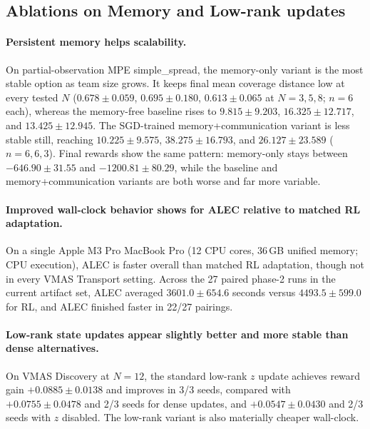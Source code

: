 \subsection{Ablations on Memory and Low-rank updates}

\paragraph{Persistent memory helps scalability.} On partial-observation MPE simple\_spread, the memory-only variant is the most stable option as team size grows. It keeps final mean coverage distance low at every tested $N$ ($0.678 \pm 0.059$, $0.695 \pm 0.180$, $0.613 \pm 0.065$ at $N=3,5,8$; $n=6$ each), whereas the memory-free baseline rises to $9.815 \pm 9.203$, $16.325 \pm 12.717$, and $13.425 \pm 12.945$. The SGD-trained memory+communication variant is less stable still, reaching $10.225 \pm 9.575$, $38.275 \pm 16.793$, and $26.127 \pm 23.589$ ($n=6,6,3$). Final rewards show the same pattern: memory-only stays between $-646.90 \pm 31.55$ and $-1200.81 \pm 80.29$, while the baseline and memory+communication variants are both worse and far more variable.

\paragraph{Improved wall-clock behavior shows for ALEC relative to matched RL adaptation.} On a single Apple M3 Pro MacBook Pro (12 CPU cores, 36\,GB unified memory; CPU execution), ALEC is faster overall than matched RL adaptation, though not in every VMAS Transport setting. Across the 27 paired phase-2 runs in the current artifact set, ALEC averaged $3601.0 \pm 654.6$ seconds versus $4493.5 \pm 599.0$ for RL, and ALEC finished faster in 22/27 pairings.

\paragraph{Low-rank state updates appear slightly better and more stable than dense alternatives.} On VMAS Discovery at $N=12$, the standard low-rank $z$ update achieves reward gain $+0.0885 \pm 0.0138$ and improves in 3/3 seeds, compared with $+0.0755 \pm 0.0478$ and 2/3 seeds for dense updates, and $+0.0547 \pm 0.0430$ and 2/3 seeds with $z$ disabled. The low-rank variant is also materially cheaper wall-clock.


